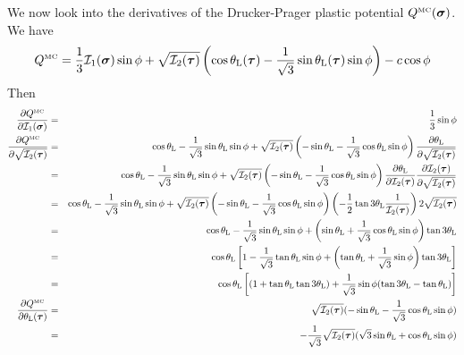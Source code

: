 We now look into the derivatives of the Drucker-Prager plastic potential $Q^{\text{\tiny MC}}(\bm\sigma)$.
We have
\[
Q^{\text{\tiny MC}}=
\frac{1}{3} {\cal I}_1({\bm \sigma}) \sin \phi  + 
\sqrt{  {\cal I}_2({\bm \tau})  } \left(\cos\theta_{\rm L}(\bm\tau)-\frac{1}{\sqrt{3}} 
\sin\theta_{\rm L} (\bm\tau) \sin\phi \right) -c \cos \phi
\]
Then
\begin{eqnarray}
\frac{\partial Q^{\text{\tiny MC}}  }{\partial {\cal I}_1(\bm\sigma)} &=& \frac13 \sin\phi \\
\frac{\partial Q^{\text{\tiny MC}}  }{\partial \sqrt {{\cal I}_2(\bm\tau)}}
&=&  
\cos \theta_{\rm L} - \frac{1}{\sqrt{3}} \sin \theta_{\rm L}  \sin \phi  
+  \sqrt{  {\cal I}_2({\bm \tau})  } 
\left(-\sin \theta_{\rm L} - \frac{1}{\sqrt{3}} \cos \theta_{\rm L}  \sin \phi \right) 
\frac{\partial \theta_{\rm L}}{\partial \sqrt {{\cal I}_2(\bm\tau)}   } \nonumber \\
&=&  
\cos \theta_{\rm L} - \frac{1}{\sqrt{3}} \sin \theta_{\rm L}  \sin \phi  
+  \sqrt{  {\cal I}_2({\bm \tau})  } 
\left(-\sin \theta_{\rm L} - \frac{1}{\sqrt{3}} \cos \theta_{\rm L}  \sin \phi \right) 
\frac{\partial \theta_{\rm L}}{\partial  {{\cal I}_2(\bm\tau)}   }  
\frac{\partial   {{\cal I}_2(\bm\tau)}     }{\partial \sqrt {{\cal I}_2(\bm\tau)}   }  \nonumber\\
&=&  
\cos \theta_{\rm L} - \frac{1}{\sqrt{3}} \sin \theta_{\rm L}  \sin \phi  
+  \sqrt{  {\cal I}_2({\bm \tau})  } 
\left(-\sin \theta_{\rm L} - \frac{1}{\sqrt{3}} \cos \theta_{\rm L}  \sin \phi \right) 
\left(
-\frac12 \tan 3\theta_{\rm L} \frac{1}{ {\cal I}_2(\bm\tau)} 
\right)
2 \sqrt {{\cal I}_2(\bm\tau)} \nonumber \\
&=&  
\cos \theta_{\rm L} - \frac{1}{\sqrt{3}} \sin \theta_{\rm L}  \sin \phi  
+  
\left(\sin \theta_{\rm L} + \frac{1}{\sqrt{3}}\cos\theta_{\rm L}\sin\phi\right) \tan 3\theta_{\rm L} \nonumber\\
&=&  
\cos \theta_{\rm L}
\left[
1 - \frac{1}{\sqrt{3}} \tan \theta_{\rm L}  \sin \phi  
+  
\left(\tan \theta_{\rm L} + \frac{1}{\sqrt{3}}   \sin \phi \right)  \tan 3\theta_{\rm L} 
\right] \nonumber\\
&=&
\cos \theta_{\rm L}
\left[
(1 +  \tan \theta_{\rm L}   \tan 3\theta_{\rm L})
+\frac{1}{\sqrt{3}} \sin\phi
( \tan 3\theta_{\rm L} - \tan\theta_{\rm L})
\right]
\\ 
\frac{\partial Q^{\text{\tiny MC}} }{\partial \theta_{\rm L}(\bm\tau)} 
&=&  
\sqrt{{\cal I}_2(\bm \tau)} (-\sin\theta_{\rm L}-\frac{1}{\sqrt{3}} \cos\theta_{\rm L} \sin\phi )\nonumber\\
&=&  
-\frac{1}{\sqrt{3}} \sqrt{{\cal I}_2(\bm \tau)} (\sqrt{3} \sin\theta_{\rm L}+\cos\theta_{\rm L} \sin\phi )
\end{eqnarray}
